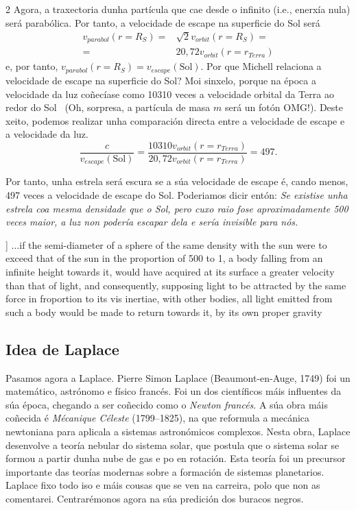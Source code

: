 \begin{multicols}{2}
Agora, a traxectoria dunha partícula que cae desde o infinito (i.e., enerxía
nula) será parabólica. Por tanto, a velocidade de escape na superficie do Sol
será
%
\begin{align}
    v_{parabol}(r=R_S) =& \sqrt{2} v_{orbit}(r=R_S) = \nonumber \\
    =& 20,72 v_{orbit}(r = r_{Terra})
\end{align}
%
e, por tanto, $v_{parabol}(r=R_S) = v_{escape}(\text{Sol})$. Por que Michell
relaciona a velocidade de escape na superficie do Sol? Moi sinxelo, porque na
época a velocidade da luz coñecíase como 10310 veces a velocidade orbital da
Terra ao redor do Sol~\cite{luz_bradley} (Oh, sorpresa, a partícula de masa
$m$ será un fotón {\large OMG}!). Deste xeito, podemos realizar unha
comparación directa entre a velocidade de escape e a velocidade da luz.
%
\begin{equation}
    \frac{c}{v_{escape}(\text{Sol})} = \frac{10310 v_{orbit}(r =
    r_{Terra})}{20,72 v_{orbit}(r = r_{Terra})} = 497.
\end{equation}

Por tanto, unha estrela será escura se a súa velocidade de escape é, cando
menos, 497 veces a velocidade de escape do Sol. Poderiamos dicir entón:
\emph{Se existise unha estrela coa mesma densidade que o Sol, pero cuxo raio
fose aproximadamente 500 veces maior, a luz non podería escapar dela e sería
invisible para nós.} %

\Cita[Michell~\cite[Proposición 16, página 42]{paper_largo_michell}]{
    ...if the semi-diameter of a sphere of the same density with the sun were
    to exceed that of the sun in the proportion of 500 to 1, a body falling
    from an infinite height towards it, would have acquired at its surface a
    greater velocity than that of light, and consequently, supposing light to
    be attracted by the same force in froportion to its vis inertiae, with
    other bodies, all light emitted from such a body would be made to return
    towards it, by its own proper gravity
}

\subsection*{Idea de Laplace}

Pasamos agora a Laplace. Pierre Simon Laplace (Beaumont-en-Auge, 1749) foi un
matemático, astrónomo e físico francés. Foi un dos científicos máis influentes
da súa época, chegando a ser coñecido como o \textit{Newton francés}. A súa
obra máis coñecida é \textit{Mécanique Céleste} (1799–1825), na que reformula a
mecánica newtoniana para aplicala a sistemas astronómicos complexos. Nesta
obra, Laplace desenvolve a teoría nebular do sistema solar, que postula que o
sistema solar se formou a partir dunha nube de gas e po en rotación. Esta
teoría foi un precursor importante das teorías modernas sobre a formación de
sistemas planetarios. Laplace fixo todo iso e máis cousas que se ven na
carreira, polo que non as comentarei. Centrarémonos agora na súa predición dos
buracos negros.


\end{multicols}
